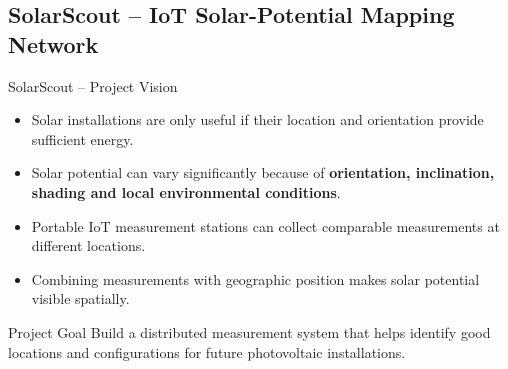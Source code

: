 \subsection{SolarScout -- IoT Solar-Potential Mapping Network}

\begin{frame}{SolarScout -- Project Vision}
\begin{itemize}
    \item Solar installations are only useful if their location and orientation provide sufficient energy.
    \item Solar potential can vary significantly because of \textbf{orientation, inclination, shading and local environmental conditions}.
    \item Portable IoT measurement stations can collect comparable measurements at different locations.
    \item Combining measurements with geographic position makes solar potential visible spatially.
\end{itemize}

\begin{block}{Project Goal}
Build a distributed measurement system that helps identify good locations and configurations for future photovoltaic installations.
\end{block}
\end{frame}

